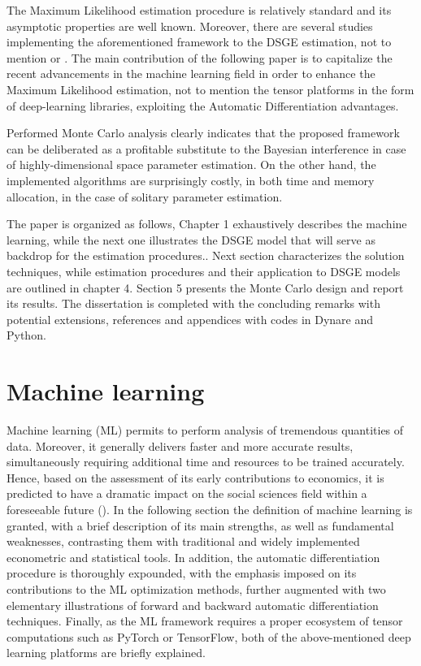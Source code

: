 \documentclass{pracamgr}
\numberwithin{equation}{section}
\begin{document}
The Maximum Likelihood estimation procedure is relatively standard and its asymptotic properties are well known. Moreover, there are several studies implementing the aforementioned framework to the DSGE estimation, not to mention \citet{ruge2007methods} or \citet{andreasen2010maximize}. The main contribution of the following paper is to capitalize the recent advancements in the machine learning field in order to enhance the Maximum Likelihood estimation, not to mention the tensor platforms in the form of deep-learning libraries, exploiting the Automatic Differentiation advantages.

Performed Monte Carlo analysis clearly indicates that the proposed framework can be deliberated as a profitable substitute to the Bayesian interference in case of highly-dimensional space parameter estimation. On the other hand, the implemented algorithms are surprisingly costly, in both time and memory allocation, in the case of solitary parameter estimation.

The paper is organized as follows, Chapter 1 exhaustively describes the machine learning, while the next one illustrates the DSGE model that will serve as backdrop for the estimation procedures.. Next section characterizes the solution techniques, while estimation procedures and their application to DSGE models are outlined in chapter 4. Section 5 presents the Monte Carlo design and report its results. The dissertation is completed with the concluding remarks with potential extensions, references and appendices with codes in Dynare and Python.

\chapter{Machine learning} \label{MachineLearning}

Machine learning (ML) permits to perform analysis of tremendous quantities of data. Moreover, it generally delivers faster and more accurate results, simultaneously requiring additional time and resources to be trained accurately. Hence, based on the assessment of its early contributions to economics, it is predicted to have a dramatic impact on the social sciences field within a foreseeable future (\citet{athey2018impact}). In the following section the definition of machine learning is granted, with a brief description of its main strengths, as well as fundamental weaknesses, contrasting them with traditional and widely implemented econometric and statistical tools. In addition, the automatic differentiation procedure is thoroughly expounded, with the emphasis imposed on its contributions to the ML optimization methods, further augmented with two elementary illustrations of forward and backward automatic differentiation techniques. Finally, as the ML framework requires a proper ecosystem of tensor computations such as PyTorch or TensorFlow, both of the above-mentioned deep learning platforms are briefly explained.
\end{document}
